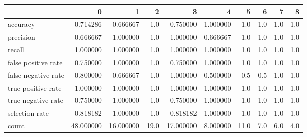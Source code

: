 \begin{tabular}{lrrrrrrrrr}
\toprule
{} &          0 &          1 &     2 &          3 &         4 &     5 &    6 &    7 &    8 \\
\midrule
accuracy            &   0.714286 &   0.666667 &   1.0 &   0.750000 &  1.000000 &   1.0 &  1.0 &  1.0 &  1.0 \\
precision           &   0.666667 &   1.000000 &   1.0 &   1.000000 &  0.666667 &   1.0 &  1.0 &  1.0 &  1.0 \\
recall              &   1.000000 &   1.000000 &   1.0 &   1.000000 &  1.000000 &   1.0 &  1.0 &  1.0 &  1.0 \\
false positive rate &   0.750000 &   1.000000 &   1.0 &   0.750000 &  1.000000 &   1.0 &  1.0 &  1.0 &  1.0 \\
false negative rate &   0.800000 &   0.666667 &   1.0 &   1.000000 &  0.500000 &   0.5 &  0.5 &  1.0 &  1.0 \\
true positive rate  &   1.000000 &   1.000000 &   1.0 &   1.000000 &  1.000000 &   1.0 &  1.0 &  1.0 &  1.0 \\
true negative rate  &   0.750000 &   1.000000 &   1.0 &   0.750000 &  1.000000 &   1.0 &  1.0 &  1.0 &  1.0 \\
selection rate      &   0.818182 &   1.000000 &   1.0 &   0.818182 &  1.000000 &   1.0 &  1.0 &  1.0 &  1.0 \\
count               &  48.000000 &  16.000000 &  19.0 &  17.000000 &  8.000000 &  11.0 &  7.0 &  6.0 &  4.0 \\
\bottomrule
\end{tabular}
